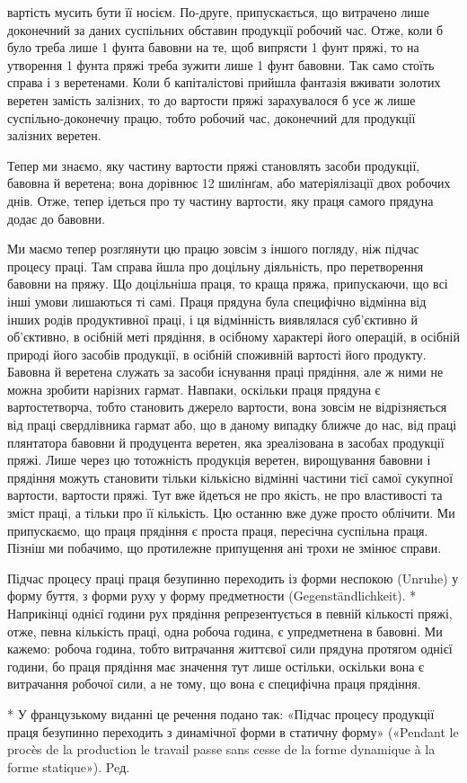 вартість мусить бути її носієм. По-друге, припускається, що витрачено
лише доконечний за даних суспільних обставин продукції
робочий час. Отже, коли б було треба лише 1 фунта бавовни
на те, щоб випрясти 1 фунт пряжі, то на утворення 1 фунта пряжі
треба зужити лише 1 фунт бавовни. Так само стоїть справа і з
веретенами. Коли б капіталістові прийшла фантазія вживати
золотих веретен замість залізних, то до вартости пряжі зарахувалося
б усе ж лише суспільно-доконечну працю, тобто робочий
час, доконечний для продукції залізних веретен.

Тепер ми знаємо, яку частину вартости пряжі становлять
засоби продукції, бавовна й веретена; вона дорівнює 12 шилінґам,
або матеріялізації двох робочих днів. Отже, тепер ідеться про
ту частину вартости, яку праця самого прядуна додає до бавовни.

Ми маємо тепер розглянути цю працю зовсім з іншого погляду,
ніж підчас процесу праці. Там справа йшла про доцільну діяльність,
про перетворення бавовни на пряжу. Що доцільніша праця,
то краща пряжа, припускаючи, що всі інші умови лишаються
ті самі. Праця прядуна була специфічно відмінна від інших
родів продуктивної праці, і ця відмінність виявлялася суб’єктивно
й об’єктивно, в осібній меті прядіння, в осібному характері його
операцій, в осібній природі його засобів продукції, в осібній споживній
вартості його продукту. Бавовна й веретена служать
за засоби існування праці прядіння, але ж ними не можна зробити
нарізних гармат. Навпаки, оскільки праця прядуна є вартостетворча,
тобто становить джерело вартости, вона зовсім не відрізняється
від праці свердлівника гармат або, що в даному випадку
ближче до нас, від праці плянтатора бавовни й продуцента
веретен, яка зреалізована в засобах продукції пряжі. Лише через
цю тотожність продукція веретен, вирощування бавовни і прядіння
можуть становити тільки кількісно відмінні частини тієї
самої сукупної вартости, вартости пряжі. Тут вже йдеться не
про якість, не про властивості та зміст праці, а тільки про її
кількість. Цю останню вже дуже просто облічити. Ми припускаємо,
що праця прядіння є проста праця, пересічна суспільна
праця. Пізніш ми побачимо, що протилежне припущення ані
трохи не змінює справи.

Підчас процесу праці праця безупинно переходить із форми
неспокою (Unruhe) у форму буття, з форми руху у форму предметности
(Gegenständlichkeit). * Наприкінці однієї години рух
прядіння репрезентується в певній кількості пряжі, отже, певна
кількість праці, одна робоча година, є упредметнена в бавовні.
Ми кажемо: робоча година, тобто витрачання життєвої сили прядуна
протягом однієї години, бо праця прядіння має значення
тут лише остільки, оскільки вона є витрачання робочої сили,
а не тому, що вона є специфічна праця прядіння.

* У французькому виданні це речення подано так: «Підчас
процесу продукції праця безупинно переходить з динамічної форми в статичну
форму» («Pendant le procès de la production le travail passe sans
cesse de la forme dynamique à la forme statique»). Peд.

